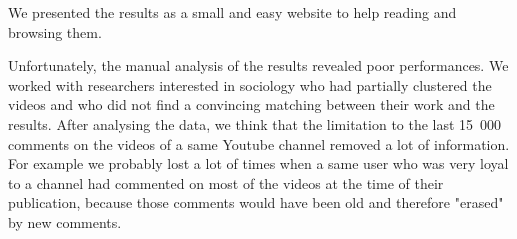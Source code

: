 We presented the results as a small and easy website to help reading and browsing them.

Unfortunately, the manual analysis of the results revealed poor performances. We worked with researchers interested in sociology who had partially clustered the videos and who did not find a convincing matching between their work and the results. After analysing the data, we think that the limitation to the last 15~000 comments on the videos of a same Youtube channel removed a lot of information. For example we probably lost a lot of times when a same user who was very loyal to a channel had commented on most of the videos at the time of their publication, because those comments would have been old and therefore "erased" by new comments.
